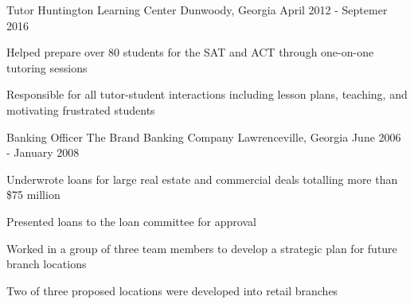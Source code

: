 \begin{cventries}
\cventry
    {Tutor} %
    {Huntington Learning Center} %
    {Dunwoody, Georgia} %
    {April 2012 - Septemer 2016} %
    {
      \begin{cvitems} %
        \item {Helped prepare over 80 students for the SAT and ACT through one-on-one tutoring sessions}
        \item {Responsible for all tutor-student interactions including lesson plans, teaching, and motivating frustrated students}
      \end{cvitems}
    }
  \cventry
    {Banking Officer} %
    {The Brand Banking Company} %
    {Lawrenceville, Georgia} %
    {June 2006 - January 2008} %
    {
      \begin{cvitems} %
        \item {Underwrote loans for large real estate and commercial deals totalling more than \$75 million }
        \item {Presented loans to the loan committee for approval}
        \item {Worked in a group of three team members to develop a strategic plan for future branch locations}
        \item {Two of three proposed locations were developed into retail branches}
      \end{cvitems} 
    }

\end{cventries}
